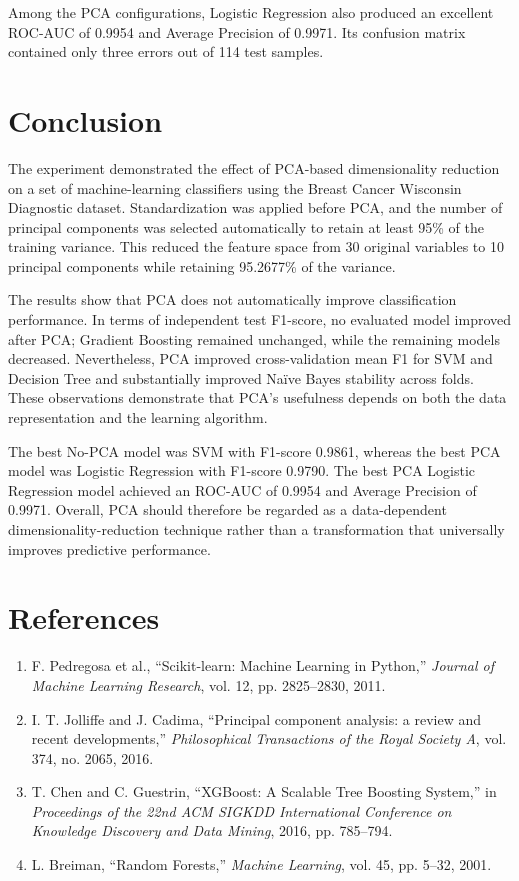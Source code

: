\documentclass[12pt,a4paper]{article}
\begin{document}
Among the PCA configurations, Logistic Regression also produced an excellent ROC-AUC of 0.9954 and Average Precision of 0.9971. Its confusion matrix contained only three errors out of 114 test samples.

\section{Conclusion}
The experiment demonstrated the effect of PCA-based dimensionality reduction on a set of machine-learning classifiers using the Breast Cancer Wisconsin Diagnostic dataset. Standardization was applied before PCA, and the number of principal components was selected automatically to retain at least 95\% of the training variance. This reduced the feature space from 30 original variables to 10 principal components while retaining 95.2677\% of the variance.

The results show that PCA does not automatically improve classification performance. In terms of independent test F1-score, no evaluated model improved after PCA; Gradient Boosting remained unchanged, while the remaining models decreased. Nevertheless, PCA improved cross-validation mean F1 for SVM and Decision Tree and substantially improved Na\"ive Bayes stability across folds. These observations demonstrate that PCA's usefulness depends on both the data representation and the learning algorithm.

The best No-PCA model was SVM with F1-score 0.9861, whereas the best PCA model was Logistic Regression with F1-score 0.9790. The best PCA Logistic Regression model achieved an ROC-AUC of 0.9954 and Average Precision of 0.9971. Overall, PCA should therefore be regarded as a data-dependent dimensionality-reduction technique rather than a transformation that universally improves predictive performance.

\section{References}
\begin{enumerate}
\item F. Pedregosa et al., ``Scikit-learn: Machine Learning in Python,'' \emph{Journal of Machine Learning Research}, vol. 12, pp. 2825--2830, 2011.
\item I. T. Jolliffe and J. Cadima, ``Principal component analysis: a review and recent developments,'' \emph{Philosophical Transactions of the Royal Society A}, vol. 374, no. 2065, 2016.
\item T. Chen and C. Guestrin, ``XGBoost: A Scalable Tree Boosting System,'' in \emph{Proceedings of the 22nd ACM SIGKDD International Conference on Knowledge Discovery and Data Mining}, 2016, pp. 785--794.
\item L. Breiman, ``Random Forests,'' \emph{Machine Learning}, vol. 45, pp. 5--32, 2001.
\end{enumerate}
\end{document}
